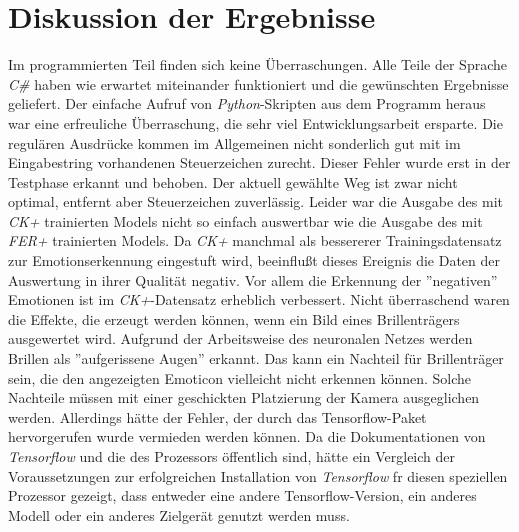 \documentclass[12pt,a4paper,headinclude,twoside, plainheadsepline, open=right,numbers=noenddot]{scrreprt}
\begin{document}
\section{Diskussion der Ergebnisse}
Im programmierten Teil finden sich keine \"{U}berraschungen. Alle Teile der Sprache \textit{C\#} haben wie erwartet miteinander funktioniert und die gew\"{u}nschten Ergebnisse geliefert. Der einfache Aufruf von \textit{Python}-Skripten aus dem Programm heraus war eine erfreuliche \"{U}berraschung, die sehr viel Entwicklungsarbeit ersparte. Die regul\"{a}ren Ausdr\"{u}cke kommen im Allgemeinen nicht sonderlich gut mit im Eingabestring vorhandenen Steuerzeichen zurecht. Dieser Fehler wurde erst in der Testphase erkannt und behoben. Der aktuell gew\"{a}hlte Weg ist zwar nicht optimal, entfernt aber Steuerzeichen zuverl\"{a}ssig. Leider war die Ausgabe des mit \textit{CK+} trainierten Models nicht so einfach auswertbar wie die Ausgabe des mit \textit{FER+} trainierten Models. Da \textit{CK+} manchmal als bessererer Trainingsdatensatz zur Emotionserkennung eingestuft wird, beeinflu{\ss}t dieses Ereignis die Daten der Auswertung in ihrer Qualit\"{a}t negativ. Vor allem die Erkennung der ''negativen'' Emotionen ist im \textit{CK+}-Datensatz erheblich verbessert.  Nicht \"{u}berraschend waren die Effekte, die erzeugt werden k\"{o}nnen, wenn ein Bild eines Brillentr\"{a}gers ausgewertet wird. Aufgrund der Arbeitsweise des neuronalen Netzes werden Brillen als ''aufgerissene Augen'' erkannt. Das kann ein Nachteil f\"{u}r Brillentr\"{a}ger sein, die den angezeigten Emoticon vielleicht nicht erkennen k\"{o}nnen. Solche Nachteile m\"{u}ssen mit einer geschickten Platzierung der Kamera ausgeglichen werden.
Allerdings  h\"{a}tte der Fehler, der durch das Tensorflow-Paket hervorgerufen wurde vermieden werden k\"{o}nnen. Da die Dokumentationen von \textit{Tensorflow} und die des Prozessors \"{o}ffentlich sind, h\"{a}tte ein Vergleich der Voraussetzungen zur erfolgreichen Installation von \textit{Tensorflow} fr diesen speziellen Prozessor gezeigt, dass entweder eine andere Tensorflow-Version, ein anderes Modell oder ein anderes Zielger\"{a}t genutzt werden muss. 
\end{document}
